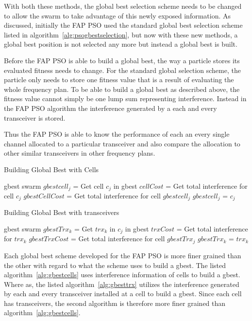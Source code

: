 With both these methods, the global best selection scheme needs to be changed to allow the swarm to take advantage of this newly exposed information. As discussed, initially the FAP PSO used the standard global best selection scheme listed in algorithm~\ref{alg:psogbestselection}, but now with these new methods, a global best position is not selected any more but instead a global best is built.

Before the FAP PSO is able to build a global best, the way a particle stores its evaluated fitness needs to change. For the standard global selection scheme, the particle only needs to store one fitness value that is a result of evaluating the whole frequency plan. To be able to build a global best as described above, the fitness value cannot simply be one lump sum representing interference. Instead in the FAP PSO algorithm the interference generated by a each and every transceiver is stored.

Thus the FAP PSO is able to know the performance of each an every single channel allocated to a particular transceiver and also compare the allocation to other similar transceivers in other frequency plans.

\begin{algorithm}
\caption{Building Global Best with Cells}
\label{alg:gbestcells}
\begin{algorithmic}[1]
\REQUIRE gbest
\REQUIRE swarm
		\STATE $gbestcell_j$ = Get cell $c_j$ in gbest
		\STATE $cellCost$ = Get total interference for cell $c_j$
		\STATE $gbestCellCost$ = Get total interference for cell $gbestcell_j$
			\STATE $gbestcell_j$ = $c_j$
		\ENDIF
	\ENDFOR
\ENDFOR
\end{algorithmic}
\end{algorithm}

\begin{algorithm}
\caption{Building Global Best with transceivers}
\label{alg:gbesttrx}
\begin{algorithmic}[1]
\REQUIRE gbest
\REQUIRE swarm
			\STATE $gbestTrx_k$ = Get $trx_k$ in $c_j$ in gbest
			\STATE $trxCost$ = Get total interference for $trx_k$
			\STATE $gbestTrxCost$ = Get total interference for cell $gbestTrx_j$
				\STATE $gbestTrx_k$ = $trx_k$
			\ENDIF
		\ENDFOR
	\ENDFOR
\ENDFOR
\end{algorithmic}
\end{algorithm}
Each global best scheme developed for the FAP PSO is more finer grained than the other with regard to what the scheme uses to build a gbest. The listed algorithm~\ref{alg:gbestcells} uses interference information of cells to build a gbest. Where as, the listed algorithm~\ref{alg:gbesttrx} utilizes the interference generated by each and every transceiver installed at a cell to build a gbest. Since each cell has transceivers, the second algorithm is therefore more finer grained than algorithm~\ref{alg:gbestcells}.

